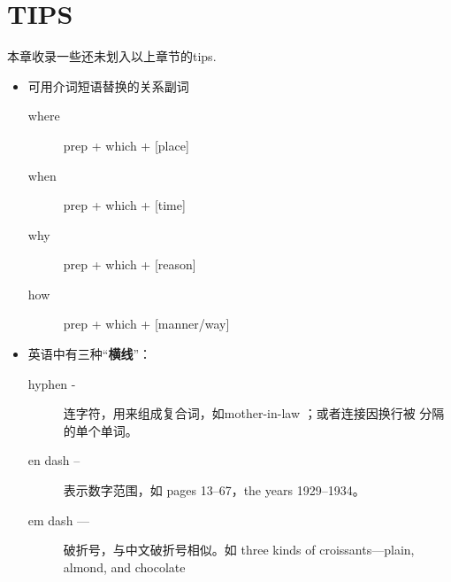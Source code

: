 \chapter{TIPS}

本章收录一些还未划入以上章节的tips.


\begin{itemize}

\item 可用介词短语替换的关系副词
  \begin{description}
  \item[where] prep + which + [place]
  \item[when] prep + which + [time]
  \item[why] prep + which + [reason]
  \item[how] prep + which + [manner/way]
  \end{description}
\item 英语中有三种“\textbf{横线}”：
  \begin{description}
  \item[hyphen -] 连字符，用来组成复合词，如mother-in-law ；或者连接因换行被
    分隔的单个单词。

  \item[en dash --] 表示数字范围，如 pages 13--67，the years 1929--1934。

  \item[em dash ---] 破折号，与中文破折号相似。如 three kinds of croissants---plain, almond, and chocolate
  \end{description}

\end{itemize}
